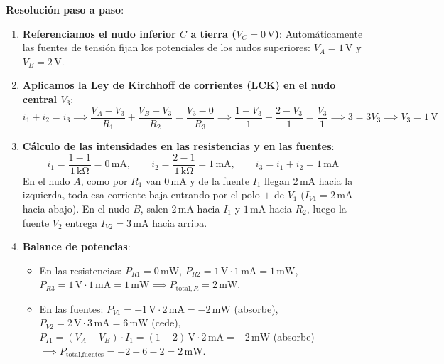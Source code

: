 \begin{ejercicio}
\textbf{Resolución paso a paso}:
\begin{enumerate}
    \item \textbf{Referenciamos el nudo inferior $C$ a tierra ($V_C = 0\,\si{\volt}$)}: Automáticamente las fuentes de tensión fijan los potenciales de los nudos superiores: $V_A = 1\,\si{\volt}$ y $V_B = 2\,\si{\volt}$.
    \item \textbf{Aplicamos la Ley de Kirchhoff de corrientes (LCK) en el nudo central $V_3$}:
    \begin{equation*}
        i_1 + i_2 = i_3 \implies \frac{V_A - V_3}{R_1} + \frac{V_B - V_3}{R_2} = \frac{V_3 - 0}{R_3} \implies \frac{1 - V_3}{1} + \frac{2 - V_3}{1} = \frac{V_3}{1} \implies 3 = 3 V_3 \implies \boxed{V_3 = 1\,\si{\volt}}
    \end{equation*}
    \item \textbf{Cálculo de las intensidades en las resistencias y en las fuentes}:
    \begin{equation*}
        i_1 = \frac{1 - 1}{1\,\si{\kilo\ohm}} = 0\,\si{\milli\ampere}, \qquad i_2 = \frac{2 - 1}{1\,\si{\kilo\ohm}} = 1\,\si{\milli\ampere}, \qquad i_3 = i_1 + i_2 = 1\,\si{\milli\ampere}
    \end{equation*}
    En el nudo $A$, como por $R_1$ van $0\,\si{\milli\ampere}$ y de la fuente $I_1$ llegan $2\,\si{\milli\ampere}$ hacia la izquierda, toda esa corriente baja entrando por el polo $+$ de $V_1$ ($I_{V1} = 2\,\si{\milli\ampere}$ hacia abajo). En el nudo $B$, salen $2\,\si{\milli\ampere}$ hacia $I_1$ y $1\,\si{\milli\ampere}$ hacia $R_2$, luego la fuente $V_2$ entrega $I_{V2} = 3\,\si{\milli\ampere}$ hacia arriba.
    \item \textbf{Balance de potencias}:
    \begin{itemize}
        \item En las resistencias: $P_{R1} = 0\,\si{\milli\watt}$, $P_{R2} = 1\,\si{\volt}\cdot 1\,\si{\milli\ampere} = 1\,\si{\milli\watt}$, $P_{R3} = 1\,\si{\volt}\cdot 1\,\si{\milli\ampere} = 1\,\si{\milli\watt} \implies P_{\text{total},R} = \boxed{2\,\si{\milli\watt}}$.
        \item En las fuentes: $P_{V1} = -1\,\si{\volt}\cdot 2\,\si{\milli\ampere} = -2\,\si{\milli\watt}$ (absorbe), $P_{V2} = 2\,\si{\volt}\cdot 3\,\si{\milli\ampere} = 6\,\si{\milli\watt}$ (cede), $P_{I1} = (V_A - V_B)\cdot I_1 = (1 - 2)\,\si{\volt}\cdot 2\,\si{\milli\ampere} = -2\,\si{\milli\watt}$ (absorbe) $\implies P_{\text{total,fuentes}} = -2 + 6 - 2 = \boxed{2\,\si{\milli\watt}}$.
    \end{itemize}
\end{enumerate}
\end{ejercicio}

